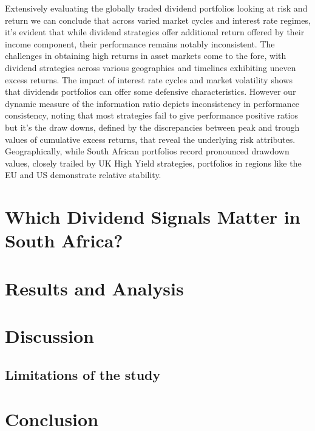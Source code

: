 \documentclass[12pt,preprint, authoryear]{elsarticle}
\numberwithin{equation}{section}
\numberwithin{figure}{section}
\numberwithin{table}{section}
\begin{document}
Extensively evaluating the globally traded dividend portfolios looking
at risk and return we can conclude that across varied market cycles and
interest rate regimes, it's evident that while dividend strategies offer
additional return offered by their income component, their performance
remains notably inconsistent. The challenges in obtaining high returns
in asset markets come to the fore, with dividend strategies across
various geographies and timelines exhibiting uneven excess returns. The
impact of interest rate cycles and market volatility shows that
dividends portfolios can offer some defensive characteristics. However
our dynamic measure of the information ratio depicts inconsistency in
performance consistency, noting that most strategies fail to give
performance positive ratios but it's the draw downs, defined by the
discrepancies between peak and trough values of cumulative excess
returns, that reveal the underlying risk attributes. Geographically,
while South African portfolios record pronounced drawdown values,
closely trailed by UK High Yield strategies, portfolios in regions like
the EU and US demonstrate relative stability.

\hypertarget{which-dividend-signals-matter-in-south-africa}{%
\section{Which Dividend Signals Matter in South
Africa?}\label{which-dividend-signals-matter-in-south-africa}}

\hypertarget{results-and-analysis}{%
\section{Results and Analysis}\label{results-and-analysis}}

\hypertarget{discussion}{%
\section{Discussion}\label{discussion}}

\hypertarget{limitations-of-the-study}{%
\subsection{Limitations of the study}\label{limitations-of-the-study}}

\hypertarget{conclusion-1}{%
\section{Conclusion}\label{conclusion-1}}
\end{document}
